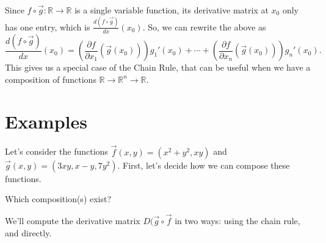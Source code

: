 \documentclass{ximera}
\begin{document}
Since $f\circ\vec{g}:\mathbb{R}\rightarrow\mathbb{R}$ is a single variable function, its derivative matrix at $x_0$ only has one entry, which is $\frac{d (f\circ\vec{g})}{dx}(x_0)$. So, we can rewrite the above as
\[
\frac{d (f\circ\vec{g})}{dx}(x_0) = \left(\frac{\partial f}{\partial x_1}(\vec{g}(x_0))\right)g_1'(x_0)+\cdots + \left(\frac{\partial f}{\partial x_n}(\vec{g}(x_0))\right)g_n'(x_0).
\]
This gives us a special case of the Chain Rule, that can be useful when we have a composition of functions $\mathbb{R}\rightarrow\mathbb{R}^n\rightarrow\mathbb{R}$.

\section*{Examples}

\begin{example}
Let's consider the functions $\vec{f}(x,y) = (x^2+y^2, xy)$ and $\vec{g}(x,y) = (3xy, x-y, 7y^2)$. First, let's decide how we can compose these functions.

Which composition(s) exist?
\begin{multipleChoice}
\end{multipleChoice}

We'll compute the derivative matrix $D(\vec{g}\circ\vec{f}$ in two ways: using the chain rule, and directly.


\end{example}
\end{document}
